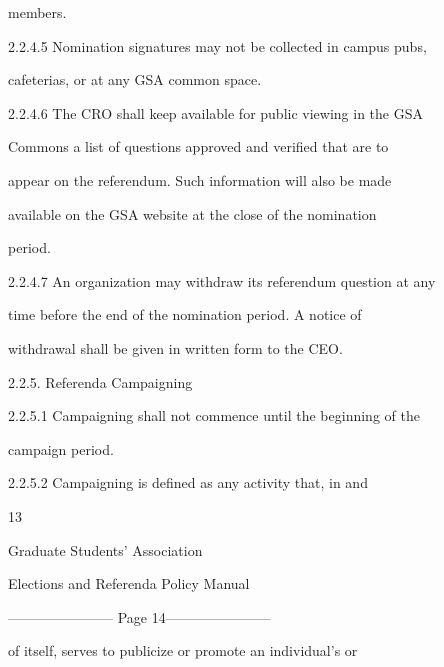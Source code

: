                 members.   

  

2.2.4.5         Nomination  signatures  may  not  be  collected  in  campus  pubs,  

                cafeterias, or at any GSA common space.   

  

2.2.4.6         The  CRO  shall  keep  available  for  public  viewing  in  the  GSA  

                Commons  a  list  of  questions  approved  and  verified  that  are  to  

                appear  on  the  referendum.  Such  information  will  also  be  made  

                available  on  the  GSA  website  at  the  close  of  the  nomination  

                period.   

  

2.2.4.7         An  organization  may  withdraw  its  referendum  question  at  any  

                time  before  the  end  of  the  nomination  period.  A  notice  of  

                withdrawal shall be given in written form to the CEO.  

  

2.2.5. Referenda Campaigning  

  

2.2.5.1         Campaigning  shall  not  commence  until  the  beginning  of  the  

                campaign period.   

  

2.2.5.2         Campaigning  is  defined  as                               any  activity  that,  in  and  

                                                         13  

                                                                                                                   

                                 Graduate Students’ Association  

                           Elections and Referenda Policy Manual  

  


----------------------- Page 14-----------------------

              of   itself,   serves   to   publicize   or   promote   an   individual’s   or  

